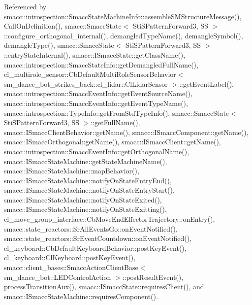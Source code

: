 Referenced by smacc\+::introspection\+::\+Smacc\+State\+Machine\+Info\+::assemble\+S\+M\+Structure\+Message(), Call\+On\+Definition(), smacc\+::\+Smacc\+State$<$ Sti\+S\+Pattern\+Forward3, S\+S $>$\+::configure\+\_\+orthogonal\+\_\+internal(), demangled\+Type\+Name(), demangle\+Symbol(), demangle\+Type(), smacc\+::\+Smacc\+State$<$ Sti\+S\+Pattern\+Forward3, S\+S $>$\+::entry\+State\+Internal(), smacc\+::\+I\+Smacc\+State\+::get\+Class\+Name(), smacc\+::introspection\+::\+Smacc\+State\+Info\+::get\+Demangled\+Full\+Name(), cl\+\_\+multirole\+\_\+sensor\+::\+Cb\+Default\+Multi\+Role\+Sensor\+Behavior$<$ sm\+\_\+dance\+\_\+bot\+\_\+strikes\+\_\+back\+::cl\+\_\+lidar\+::\+Cl\+Lidar\+Sensor $>$\+::get\+Event\+Label(), smacc\+::introspection\+::\+Smacc\+Event\+Info\+::get\+Event\+Source\+Name(), smacc\+::introspection\+::\+Smacc\+Event\+Info\+::get\+Event\+Type\+Name(), smacc\+::introspection\+::\+Type\+Info\+::get\+From\+Std\+Type\+Info(), smacc\+::\+Smacc\+State$<$ Sti\+S\+Pattern\+Forward3, S\+S $>$\+::get\+Full\+Name(), smacc\+::\+I\+Smacc\+Client\+Behavior\+::get\+Name(), smacc\+::\+I\+Smacc\+Component\+::get\+Name(), smacc\+::\+I\+Smacc\+Orthogonal\+::get\+Name(), smacc\+::\+I\+Smacc\+Client\+::get\+Name(), smacc\+::introspection\+::\+Smacc\+Event\+Info\+::get\+Orthogonal\+Name(), smacc\+::\+I\+Smacc\+State\+Machine\+::get\+State\+Machine\+Name(), smacc\+::\+I\+Smacc\+State\+Machine\+::map\+Behavior(), smacc\+::\+I\+Smacc\+State\+Machine\+::notify\+On\+State\+Entry\+End(), smacc\+::\+I\+Smacc\+State\+Machine\+::notify\+On\+State\+Entry\+Start(), smacc\+::\+I\+Smacc\+State\+Machine\+::notify\+On\+State\+Exited(), smacc\+::\+I\+Smacc\+State\+Machine\+::notify\+On\+State\+Exitting(), cl\+\_\+move\+\_\+group\+\_\+interface\+::\+Cb\+Move\+End\+Effector\+Trajectory\+::on\+Entry(), smacc\+::state\+\_\+reactors\+::\+Sr\+All\+Events\+Go\+::on\+Event\+Notified(), smacc\+::state\+\_\+reactors\+::\+Sr\+Event\+Countdown\+::on\+Event\+Notified(), cl\+\_\+keyboard\+::\+Cb\+Default\+Keyboard\+Behavior\+::post\+Key\+Event(), cl\+\_\+keyboard\+::\+Cl\+Keyboard\+::post\+Key\+Event(), smacc\+::client\+\_\+bases\+::\+Smacc\+Action\+Client\+Base$<$ sm\+\_\+dance\+\_\+bot\+::\+L\+E\+D\+Control\+Action $>$\+::post\+Result\+Event(), process\+Transition\+Aux(), smacc\+::\+I\+Smacc\+State\+::requires\+Client(), and smacc\+::\+I\+Smacc\+State\+Machine\+::requires\+Component().


